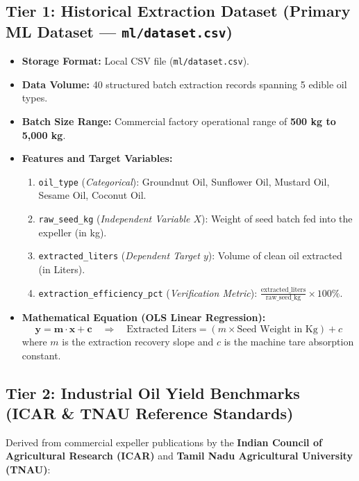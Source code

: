 \documentclass[11pt,a4paper]{article}
\begin{document}
\subsection{Tier 1: Historical Extraction Dataset (Primary ML Dataset --- \texttt{ml/dataset.csv})}
\begin{itemize}[leftmargin=1.5em]
    \item \textbf{Storage Format:} Local CSV file (\texttt{ml/dataset.csv}).
    \item \textbf{Data Volume:} 40 structured batch extraction records spanning 5 edible oil types.
    \item \textbf{Batch Size Range:} Commercial factory operational range of \textbf{500 kg to 5,000 kg}.
    \item \textbf{Features and Target Variables:}
    \begin{enumerate}
        \item \texttt{oil\_type} (\textit{Categorical}): Groundnut Oil, Sunflower Oil, Mustard Oil, Sesame Oil, Coconut Oil.
        \item \texttt{raw\_seed\_kg} (\textit{Independent Variable $X$}): Weight of seed batch fed into the expeller (in kg).
        \item \texttt{extracted\_liters} (\textit{Dependent Target $y$}): Volume of clean oil extracted (in Liters).
        \item \texttt{extraction\_efficiency\_pct} (\textit{Verification Metric}): $\frac{\text{extracted\_liters}}{\text{raw\_seed\_kg}} \times 100\%$.
    \end{enumerate}
    \item \textbf{Mathematical Equation (OLS Linear Regression):}
    \[
    \mathbf{y = m \cdot x + c} \quad \Longrightarrow \quad \text{Extracted Liters} = (m \times \text{Seed Weight in Kg}) + c
    \]
    where $m$ is the extraction recovery slope and $c$ is the machine tare absorption constant.
\end{itemize}

\subsection{Tier 2: Industrial Oil Yield Benchmarks (ICAR \& TNAU Reference Standards)}
Derived from commercial expeller publications by the \textbf{Indian Council of Agricultural Research (ICAR)} and \textbf{Tamil Nadu Agricultural University (TNAU)}:
\end{document}
